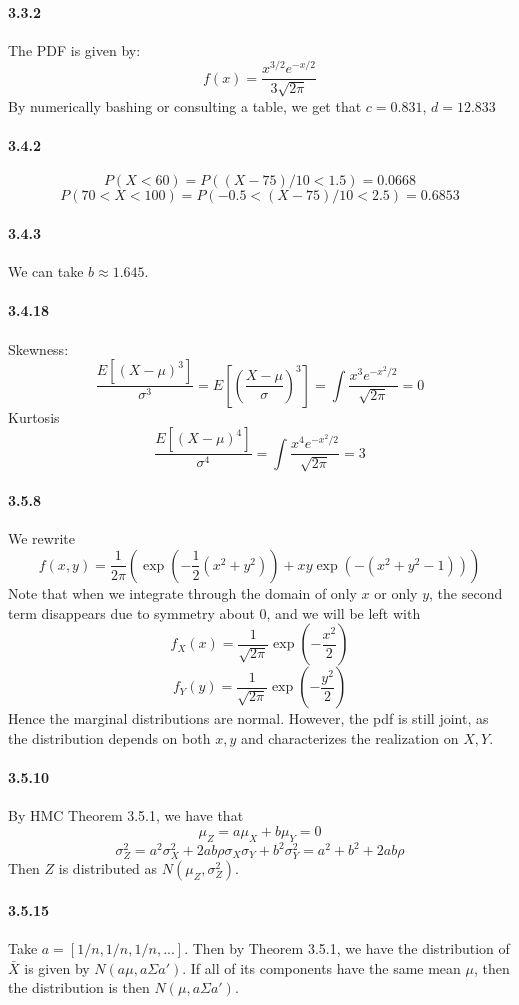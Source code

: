 \documentclass[10pt,letter]{article}
\begin{document}
\paragraph{3.3.2}
The PDF is given by:
\[ f(x) = \frac{x^{3/2}e^{-x/2}}{3\sqrt{2\pi}} \]
By numerically bashing or consulting a table, we get that $c = 0.831$, $d = 12.833$
\paragraph{3.4.2}
\[ P(X < 60) = P((X-75)/10 < 1.5) =0.0668 \]
\[ P(70 < X < 100) = P( -0.5 < (X-75)/10 < 2.5) = 0.6853 \]
\paragraph{3.4.3}
We can take $b \approx 1.645$.
\paragraph{3.4.18}
Skewness:
\[ \frac{E[(X-\mu)^3]}{\sigma^3} = E\left[\left( \frac{X-\mu}{\sigma} \right)^3 \right] = \int \frac{x^3e^{-x^2/2}}{\sqrt{2\pi}} = 0 \]
Kurtosis
\[ \frac{E[(X-\mu)^4]}{\sigma^4} = \int \frac{x^4e^{-x^2/2}}{\sqrt{2\pi}} = 3 \]
\paragraph{3.5.8}
We rewrite
\[ f(x,y) = \frac{1}{2\pi} \left( \exp \left(-\frac{1}{2}(x^2+y^2)\right) + xy\exp \left(-(x^2+y^2-1)\right) \right) \]
Note that when we integrate through the domain of only $x$ or only $y$, the second term disappears due to symmetry about 0, and we will be left with
\[ f_X(x) = \frac{1}{\sqrt{2\pi}} \exp\left(-\frac{x^2}{2} \right) \]
\[ f_Y(y) = \frac{1}{\sqrt{2\pi}} \exp\left(-\frac{y^2}{2} \right) \]
Hence the marginal distributions are normal. However, the pdf is still joint, as the distribution depends on both $x,y$ and characterizes the realization on $X,Y$.
\paragraph{3.5.10}
By HMC Theorem 3.5.1, we have that
\[ \mu_Z = a\mu_X + b\mu_Y = 0 \]
\[ \sigma^2_Z = a^2 \sigma_X^2 + 2ab \rho \sigma_X \sigma_Y  + b^2 \sigma_Y^2= a^2 + b^2 + 2ab\rho \]
Then $Z$ is distributed as $N(\mu_Z, \sigma^2_Z)$.
\paragraph{3.5.15}
Take $a = [ 1/n, 1/n, 1/n, ...]$. Then by Theorem 3.5.1, we have the distribution of $\bar{X}$ is given by $N(a \mu, a \Sigma a')$. If all of its components have the same mean $\mu$, then the distribution is then $N(\mu, a\Sigma a')$.
\end{document}
